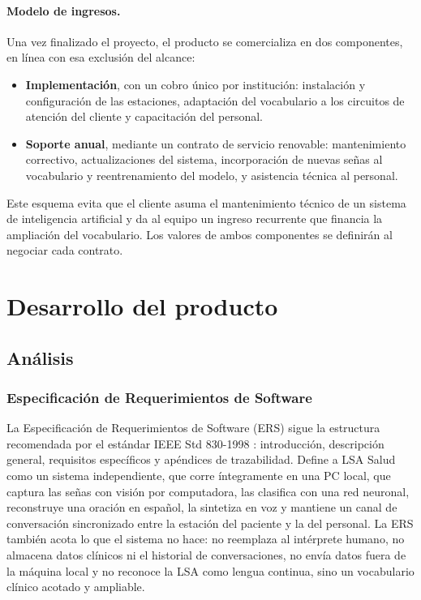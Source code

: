 \paragraph{Modelo de ingresos.} Una vez finalizado el proyecto, el producto se comercializa en dos componentes, en línea con esa exclusión del alcance:
\begin{itemize}
  \item \textbf{Implementación}, con un cobro único por institución: instalación y configuración de las estaciones, adaptación del vocabulario a los circuitos de atención del cliente y capacitación del personal.
  \item \textbf{Soporte anual}, mediante un contrato de servicio renovable: mantenimiento correctivo, actualizaciones del sistema, incorporación de nuevas señas al vocabulario y reentrenamiento del modelo, y asistencia técnica al personal.
\end{itemize}
Este esquema evita que el cliente asuma el mantenimiento técnico de un sistema de inteligencia artificial y da al equipo un ingreso recurrente que financia la ampliación del vocabulario. Los valores de ambos componentes se definirán al negociar cada contrato.

\section{Desarrollo del producto}

\subsection{Análisis}

\subsubsection{Especificación de Requerimientos de Software}

La Especificación de Requerimientos de Software (ERS) sigue la estructura recomendada por el estándar IEEE Std 830-1998 \parencite{ieee830}: introducción, descripción general, requisitos específicos y apéndices de trazabilidad. Define a LSA Salud como un sistema independiente, que corre íntegramente en una PC local, que captura las señas con visión por computadora, las clasifica con una red neuronal, reconstruye una oración en español, la sintetiza en voz y mantiene un canal de conversación sincronizado entre la estación del paciente y la del personal. La ERS también acota lo que el sistema no hace: no reemplaza al intérprete humano, no almacena datos clínicos ni el historial de conversaciones, no envía datos fuera de la máquina local y no reconoce la LSA como lengua continua, sino un vocabulario clínico acotado y ampliable.

